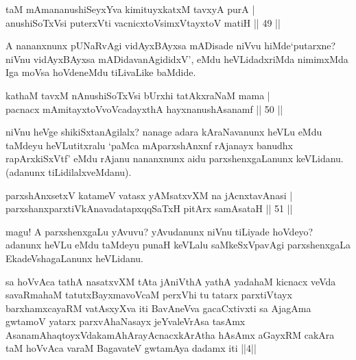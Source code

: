 
\begin{shl}
taM mAmananushiSeyxYva kimituyxkatxM tavxyA purA | \\
anushiSoTxV\s si puterxVti vacnicxtoV\s simxVtayxtoV matiH \hfill|| 49 || 
\end{shl}

\begin{artha}
A nananxnunx pUNaRvAgi vidAyxBAyxsa mADisade niVvu hiMde`putarxne? 
niVnu vidAyxBAyxsa mADidavanAgididxV', eMdu heVLidadxriMda nimimxMda 
Iga moVsa hoVdeneMdu tiLivaLike baMdide.
\end{artha}

\begin{shl}
kathaM tavxM nAnushiSoTxV\s si bUrxhi tatAkxraNaM mama | \\
pacnacx mAmitayxtoV\s voVcadayxthA hayxnanushAsanamf \hfill|| 50 || 
\end{shl}

\begin{artha}
niVnu heVge shikiSxtanAgilalx? nanage adara kAraNavanunx heVLu eMdu 
taMdeyu heVLutitxralu `paMca mAparxshAnxnf rAjanayx banudhx 
rapArxkiSxVtf' eMdu rAjanu nananxnunx aidu parxshenxgaLanunx 
keVLidanu. (adanunx tiLidilalxveMdanu).
\end{artha}

\begin{shl}
parxshAnxsetxV katameV vatasx yAMsatxvXM na jAcnxtavAnasi | \\
parxshanxparxtiVkAnavadatapxqqSaTxH pitArx samAsataH \hfill|| 51 || 
\end{shl}

\begin{artha}
magu! A parxshenxgaLu yAvuvu? yAvudanunx niVnu tiLiyade hoVdeyo? 
adanunx heVLu eMdu taMdeyu punaH keVLalu saMkeSxVpavAgi parxshenxgaLa 
EkadeVshagaLanunx heVLidanu.
\end{artha}


\begin{shl}
\footnotemark[1]sa hoVvAca tathA nasatxvXM tAta jAniVthA yathA yadahaM kicnacx veVda savaRmahaM tatutxBayxmavoVcaM perxVhi tu tatarx parxtiVtayx barxhamxcayaRM vatAsxyXva iti BavAneVva gacaCxtivxti sa AjagAma gwtamoV yatarx parxvAhaNasayx jeYvaleVrAsa tasAmx AsanamAhaqtoyxVdakamAhArayAcnacxkArAtha hAsAmx aGayxRM cakAra taM hoVvAca varaM BagavateV gwtamAya dadamx iti ||4||
\end{shl}

